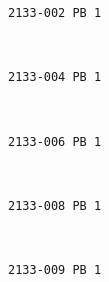 \documentclass[11pt]{article}
\begin{document}
    \begin{Verbatim}[commandchars=\\\{\}]
2133-002 PB 1

    \end{Verbatim}

    \begin{center}
    \end{center}
    { \hspace*{\fill} \\}
    
    \begin{Verbatim}[commandchars=\\\{\}]
2133-004 PB 1

    \end{Verbatim}

    \begin{center}
    \end{center}
    { \hspace*{\fill} \\}
    
    \begin{Verbatim}[commandchars=\\\{\}]
2133-006 PB 1

    \end{Verbatim}

    \begin{center}
    \end{center}
    { \hspace*{\fill} \\}
    
    \begin{Verbatim}[commandchars=\\\{\}]
2133-008 PB 1

    \end{Verbatim}

    \begin{center}
    \end{center}
    { \hspace*{\fill} \\}
    
    \begin{Verbatim}[commandchars=\\\{\}]
2133-009 PB 1

    \end{Verbatim}
\end{document}
